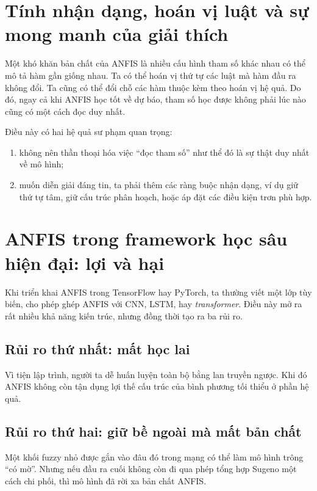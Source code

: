 \section{Tính nhận dạng, hoán vị luật và sự mong manh của giải thích}

Một khó khăn bản chất của ANFIS là nhiều cấu hình tham số khác nhau có thể mô tả hàm gần giống nhau. Ta có thể hoán vị thứ tự các luật mà hàm đầu ra không đổi. Ta cũng có thể đổi chỗ các hàm thuộc kèm theo hoán vị hệ quả. Do đó, ngay cả khi ANFIS học tốt về dự báo, tham số học được không phải lúc nào cũng có một cách đọc duy nhất.

Điều này có hai hệ quả sư phạm quan trọng:

\begin{enumerate}
\item không nên thần thoại hóa việc ``đọc tham số'' như thể đó là sự thật duy nhất về mô hình;
\item muốn diễn giải đáng tin, ta phải thêm các ràng buộc nhận dạng, ví dụ giữ thứ tự tâm, giữ cấu trúc phân hoạch, hoặc áp đặt các điều kiện trơn phù hợp.
\end{enumerate}

\section{ANFIS trong framework học sâu hiện đại: lợi và hại}

Khi triển khai ANFIS trong TensorFlow hay PyTorch, ta thường viết một lớp tùy biến, cho phép ghép ANFIS với CNN, LSTM, hay \emph{transformer}. Điều này mở ra rất nhiều khả năng kiến trúc, nhưng đồng thời tạo ra ba rủi ro.

\subsection{Rủi ro thứ nhất: mất học lai}

Vì tiện lập trình, người ta dễ huấn luyện toàn bộ bằng lan truyền ngược. Khi đó ANFIS không còn tận dụng lợi thế cấu trúc của bình phương tối thiểu ở phần hệ quả.

\subsection{Rủi ro thứ hai: giữ bề ngoài mà mất bản chất}

Một khối fuzzy nhỏ được gắn vào đâu đó trong mạng có thể làm mô hình trông ``có mờ''. Nhưng nếu đầu ra cuối không còn đi qua phép tổng hợp Sugeno một cách chi phối, thì mô hình đã rời xa bản chất ANFIS.

